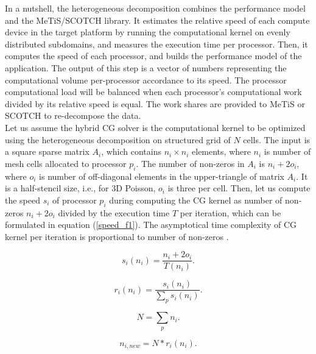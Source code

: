 \documentclass[3p,times]{elsarticle}
\begin{document}
In a nutshell, the heterogeneous decomposition combines the performance model \cite{fupermode, fpm_14} and the MeTiS/SCOTCH library. It estimates the relative speed of each compute device in the target platform by running the computational kernel on evenly distributed subdomains, and measures the execution time per processor. Then, it computes the speed of each processor, and builds the performance model of the application. The output of this step is a vector of numbers representing the computational volume per-processor accordance to its speed. The processor computational load will be balanced when each processor's computational work divided by its relative speed is equal. The work shares are provided to MeTiS or SCOTCH to re-decompose the data. \\

Let us assume the hybrid CG solver is the computational kernel to be optimized using the heterogeneous decomposition on structured grid of \emph{$N$} cells. The input is a square sparse matrix \emph{$A_i$}, which contains \emph{$n_i \times n_i$} elements, where \emph{$n_i$} is number of mesh cells allocated to processor \emph{$p_i$}. The number of non-zeros in \emph{$A_i$} is \emph{$n_{i}+2o_{i}$}, where \emph{$o_i$} is number of off-diagonal elements in the upper-triangle of matrix  \emph{$A_i$}.  It is a half-stencil size, i.e., for 3D Poisson, \emph{$o_i$} is three per cell. Then, let us compute the speed \emph{$s_{i}$} of processor \emph{$p_{i}$} during computing the CG kernel as number of non-zeros \emph{$n_{i}+2o_{i}$} divided by the execution time \emph{$T$} per iteration, which can be formulated in equation (\ref{speed_f1}). The asymptotical time complexity of CG kernel per iteration is proportional to number of non-zeros \cite{saad_book}. 

\begin{equation}\label{speed_f1}
s_{i}(n_{i}) = \frac{n_{i}+2o_{i}}{T(n_{i})} .
\end{equation}

\begin{equation}\label{relative_f2}
r_{i}(n_i) = \frac{s_{i}(n_{i})}{\sum_{p}{s_{i}(n_{i})}} .
\end{equation}


\begin{equation}\label{N_dif}
N = \sum_{p}{n_{i}} .
\end{equation}

\begin{equation}\label{percentage_f1}
n_{i, new} = N *r_{i}(n_{i}) .
\end{equation}
\end{document}
